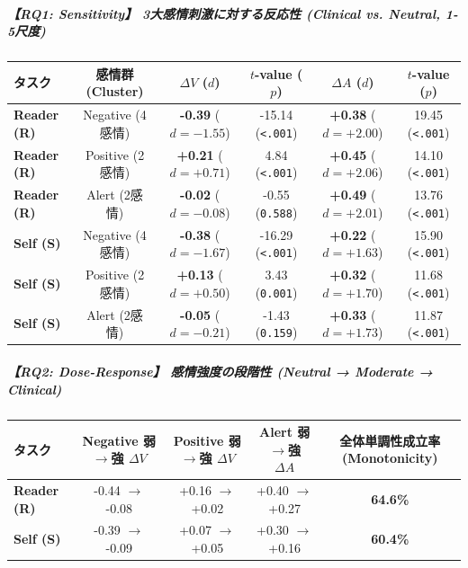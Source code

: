 \subparagraph{【RQ1: Sensitivity】 3大感情刺激に対する反応性 (Clinical vs. Neutral, 1-5尺度)}
\begin{center}
\small
\begin{tabular}{lccccc}
\toprule
\textbf{タスク} & \textbf{感情群 (Cluster)} & \textbf{$\Delta V$ ($d$)} & \textbf{$t$-value ($p$)} & \textbf{$\Delta A$ ($d$)} & \textbf{$t$-value ($p$)} \\
\midrule
\textbf{Reader (R)} & Negative (4感情) & \textbf{-0.39} ($d=-1.55$) & -15.14 (\texttt{<.001}) & \textbf{+0.38} ($d=+2.00$) & 19.45 (\texttt{<.001}) \\
\textbf{Reader (R)} & Positive (2感情) & \textbf{+0.21} ($d=+0.71$) & 4.84 (\texttt{<.001}) & \textbf{+0.45} ($d=+2.06$) & 14.10 (\texttt{<.001}) \\
\textbf{Reader (R)} & Alert (2感情) & \textbf{-0.02} ($d=-0.08$) & -0.55 (\texttt{0.588}) & \textbf{+0.49} ($d=+2.01$) & 13.76 (\texttt{<.001}) \\
\textbf{Self (S)} & Negative (4感情) & \textbf{-0.38} ($d=-1.67$) & -16.29 (\texttt{<.001}) & \textbf{+0.22} ($d=+1.63$) & 15.90 (\texttt{<.001}) \\
\textbf{Self (S)} & Positive (2感情) & \textbf{+0.13} ($d=+0.50$) & 3.43 (\texttt{0.001}) & \textbf{+0.32} ($d=+1.70$) & 11.68 (\texttt{<.001}) \\
\textbf{Self (S)} & Alert (2感情) & \textbf{-0.05} ($d=-0.21$) & -1.43 (\texttt{0.159}) & \textbf{+0.33} ($d=+1.73$) & 11.87 (\texttt{<.001}) \\
\bottomrule
\end{tabular}
\end{center}


\subparagraph{【RQ2: Dose-Response】 感情強度の段階性 (Neutral → Moderate → Clinical)}
\begin{center}
\small
\begin{tabular}{lcccc}
\toprule
\textbf{タスク} & \textbf{Negative 弱$\rightarrow$強 $\Delta V$} & \textbf{Positive 弱$\rightarrow$強 $\Delta V$} & \textbf{Alert 弱$\rightarrow$強 $\Delta A$} & \textbf{全体単調性成立率 (Monotonicity)} \\
\midrule
\textbf{Reader (R)} & -0.44 $\rightarrow$ -0.08 & +0.16 $\rightarrow$ +0.02 & +0.40 $\rightarrow$ +0.27 & \textbf{64.6\%} \\
\textbf{Self (S)} & -0.39 $\rightarrow$ -0.09 & +0.07 $\rightarrow$ +0.05 & +0.30 $\rightarrow$ +0.16 & \textbf{60.4\%} \\
\bottomrule
\end{tabular}
\end{center}



